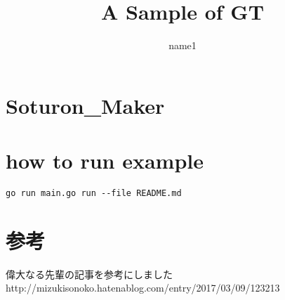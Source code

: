 \documentclass[ams]{U-AizuGT}
\author{name1}
\title{A Sample of GT}
\begin{document}
\maketitle
\section{Soturon\_Maker}

\section{how to run example}

\begin{verbatim}
go run main.go run --file README.md
\end{verbatim}

\section{参考}

偉大なる先輩の記事を参考にしました
http://mizukisonoko.hatenablog.com/entry/2017/03/09/123213
\end{document}
